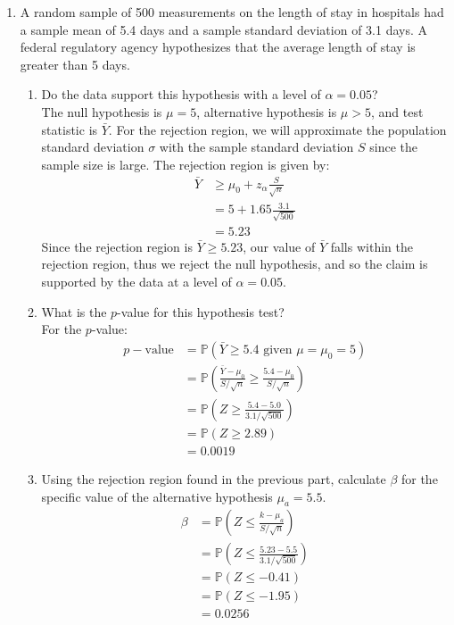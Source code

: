 \documentclass[12pt]{article}
\def\P{{\mathbb P}}
\begin{document}
\begin{enumerate}
\item A random sample of 500 measurements on the length of stay in hospitals had a sample mean of 5.4 days and a sample standard deviation of 3.1 days. A federal regulatory agency hypothesizes that the average length of stay is greater than 5 days.
\begin{enumerate}
\item Do the data support this hypothesis with a level of $\alpha = 0.05$?\\

The null hypothesis is $\mu = 5$, alternative hypothesis is $\mu > 5$, and test statistic is $\bar{Y}$. For the rejection region, we will approximate the population standard deviation $\sigma$ with the sample standard deviation $S$ since the sample size is large. The rejection region is given by:
\begin{align*}
\bar{Y} &\geq \mu_0 + z_{\alpha} \frac{S}{\sqrt{n}} \\
&= 5 + 1.65 \frac{3.1}{\sqrt{500}} \\
&= 5.23
\end{align*}
Since the rejection region is $\bar{Y} \geq 5.23$, our value of $\bar{Y}$ falls within the rejection region, thus we reject the null hypothesis, and so the claim is supported by the data at a level of $\alpha = 0.05$.

\item What is the $p$-value for this hypothesis test?\\

For the $p$-value:
\begin{align*}
p-\text{value} &= \P(\bar{Y} \geq 5.4 \text{ given } \mu = \mu_0 = 5 )\\
&= \P \left( \frac{\bar{Y} - \mu_0}{ S / \sqrt{n} } \geq  \frac{5.4 - \mu_0}{ S / \sqrt{n}} \right) \\
&= \P \left( Z \geq  \frac{5.4 - 5.0}{ 3.1 / \sqrt{500} } \right) \\
&= \P ( Z \geq 2.89) \\
&= 0.0019
\end{align*}

\item Using the rejection region found in the previous part, calculate $\beta$ for the specific value of the alternative hypothesis $\mu_a = 5.5$.\\

\begin{align*}
\beta &= \P\left( Z \leq \frac{ k - \mu_a}{ S / \sqrt{n} } \right) \\
&= \P\left( Z \leq \frac{ 5.23 - 5.5 }{ 3.1 / \sqrt{500} } \right) \\
&= \P (Z \leq -0.41 )\\
&= \P (Z \leq -1.95 )\\
&= 0.0256
\end{align*}


\end{enumerate}
\end{enumerate}
\end{document}
